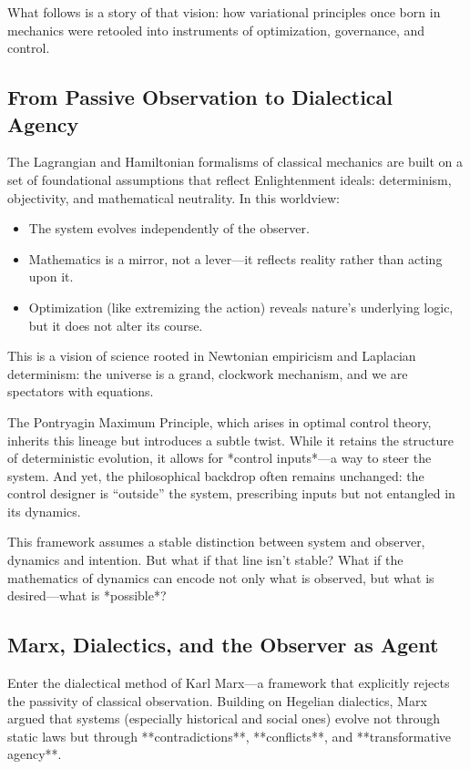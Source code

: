 What follows is a story of that vision: how variational principles once born in mechanics were retooled into instruments of optimization, governance, and control.

\subsection{From Passive Observation to Dialectical Agency}

The Lagrangian and Hamiltonian formalisms of classical mechanics are built on a set of foundational assumptions that reflect Enlightenment ideals: determinism, objectivity, and mathematical neutrality. In this worldview:

\begin{itemize}
	\item The system evolves independently of the observer.  
	\item Mathematics is a mirror, not a lever—it reflects reality rather than acting upon it.  
	\item Optimization (like extremizing the action) reveals nature’s underlying logic, but it does not alter its course.
\end{itemize}

This is a vision of science rooted in Newtonian empiricism and Laplacian determinism: the universe is a grand, clockwork mechanism, and we are spectators with equations.

The Pontryagin Maximum Principle, which arises in optimal control theory, inherits this lineage but introduces a subtle twist. While it retains the structure of deterministic evolution, it allows for *control inputs*—a way to steer the system. And yet, the philosophical backdrop often remains unchanged: the control designer is “outside” the system, prescribing inputs but not entangled in its dynamics.

This framework assumes a stable distinction between system and observer, dynamics and intention. But what if that line isn't stable? What if the mathematics of dynamics can encode not only what is observed, but what is desired—what is *possible*?




\subsection{Marx, Dialectics, and the Observer as Agent}

Enter the dialectical method of Karl Marx—a framework that explicitly rejects the passivity of classical observation. Building on Hegelian dialectics, Marx argued that systems (especially historical and social ones) evolve not through static laws but through **contradictions**, **conflicts**, and **transformative agency**.

